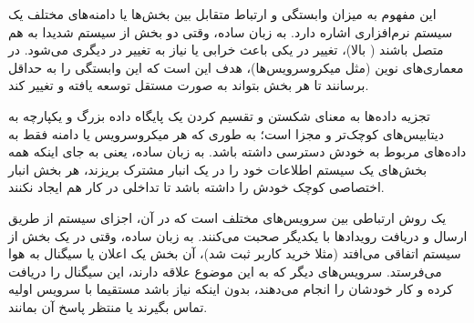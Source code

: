 این مفهوم به میزان وابستگی و ارتباط متقابل بین بخش‌ها یا دامنه‌های مختلف یک سیستم نرم‌افزاری اشاره دارد. به زبان ساده، وقتی دو بخش از سیستم شدیدا به هم متصل باشند ( بالا)، تغییر در یکی باعث خرابی یا نیاز به تغییر در دیگری می‌شود. در معماری‌های نوین (مثل میکروسرویس‌ها)، هدف این است که این وابستگی را به حداقل برسانند تا هر بخش بتواند به صورت مستقل توسعه یافته و تغییر کند.

تجزیه داده‌ها به معنای شکستن و تقسیم کردن یک پایگاه داده بزرگ و یکپارچه به دیتابیس‌های کوچک‌تر و مجزا است؛ به طوری که هر میکروسرویس یا دامنه فقط به داده‌های مربوط به خودش دسترسی داشته باشد. به زبان ساده، یعنی به جای اینکه همه بخش‌های یک سیستم اطلاعات خود را در یک انبار مشترک بریزند، هر بخش انبار اختصاصی کوچک خودش را داشته باشد تا تداخلی در کار هم ایجاد نکنند.

یک روش ارتباطی بین سرویس‌های مختلف است که در آن، اجزای سیستم از طریق ارسال و دریافت رویدادها با یکدیگر صحبت می‌کنند. به زبان ساده، وقتی در یک بخش از سیستم اتفاقی می‌افتد (مثلا خرید کاربر ثبت شد)، آن بخش یک اعلان یا سیگنال به هوا می‌فرستد. سرویس‌های دیگر که به این موضوع علاقه دارند، این سیگنال را دریافت کرده و کار خودشان را انجام می‌دهند، بدون اینکه نیاز باشد مستقیما با سرویس اولیه تماس بگیرند یا منتظر پاسخ آن بمانند.
